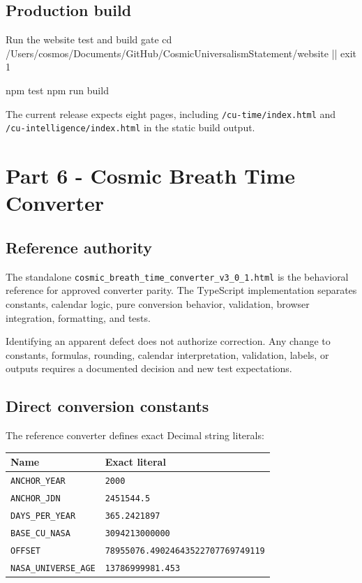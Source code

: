 \documentclass[11pt,letterpaper]{article}
\newcommand{\filepath}[1]{\nolinkurl{#1}}
\begin{document}
\subsection{Production build}

\begin{commandbox}{Run the website test and build gate}
cd /Users/cosmos/Documents/GitHub/CosmicUniversalismStatement/website || exit 1

npm test
npm run build
\end{commandbox}

The current release expects eight pages, including
\filepath{/cu-time/index.html} and \filepath{/cu-intelligence/index.html} in
the static build output.

\section{Part 6 - Cosmic Breath Time Converter}

\subsection{Reference authority}

The standalone
\filepath{cosmic\_breath\_time\_converter\_v3\_0\_1.html} is the behavioral
reference for approved converter parity. The TypeScript implementation
separates constants, calendar logic, pure conversion behavior, validation,
browser integration, formatting, and tests.

\begin{safetybox}
Identifying an apparent defect does not authorize correction. Any change to
constants, formulas, rounding, calendar interpretation, validation, labels, or
outputs requires a documented decision and new test expectations.
\end{safetybox}

\subsection{Direct conversion constants}

The reference converter defines exact Decimal string literals:

\begin{tabularx}{\textwidth}{L{1.75in}Y}
\toprule
\textbf{Name} & \textbf{Exact literal} \\
\midrule
\texttt{ANCHOR\_YEAR} & \texttt{2000} \\
\texttt{ANCHOR\_JDN} & \texttt{2451544.5} \\
\texttt{DAYS\_PER\_YEAR} & \texttt{365.2421897} \\
\texttt{BASE\_CU\_NASA} & \texttt{3094213000000} \\
\texttt{OFFSET} & \texttt{78955076.49024643522707769749119} \\
\texttt{NASA\_UNIVERSE\_AGE} & \texttt{13786999981.453} \\
\bottomrule
\end{tabularx}
\end{document}
